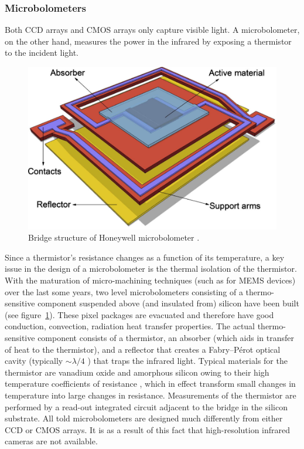\subsubsection{Microbolometers}
Both CCD arrays and CMOS arrays only capture visible light.
%
A microbolometer, on the other hand, measures the power in the infrared by exposing a thermistor to the incident light.
%
\begin{figure}[!htbp][b]
	\center
	\includegraphics[width=.7\linewidth,keepaspectratio]{figures/background/microbolometer2.png}
	\caption{Bridge structure of Honeywell microbolometer \cite{KESIM2014245}.}
	\label{fig:microbolometer}
\end{figure}
%
Since a thermistor's resistance changes as a function of its temperature, a key issue in the design of a microbolometer is the thermal isolation of the thermistor.
%
With the maturation of micro-machining techniques (such as for MEMS devices) over the last some years, two level microbolometers consisting of a thermo-sensitive component suspended above (and insulated from) silicon have been built (see figure~\ref{fig:microbolometer}).
%
These pixel packages are evacuated and therefore have good conduction, convection, radiation heat transfer properties.
%
The actual thermo-sensitive component consists of a thermistor, an absorber (which aids in transfer of heat to the thermistor), and a reflector that creates a Fabry–Pérot optical cavity (typically \({\sim}\lambda/4\) \cite{bolometer}) that traps the infrared light.
%
Typical materials for the thermistor are vanadium oxide and amorphous silicon owing to their high temperature coefficients of resistance \cite{bolometer}, which in effect transform small changes in temperature into large changes in resistance.
%
Measurements of the thermistor are performed by a read-out integrated circuit adjacent to the bridge in the silicon substrate.
%
All told microbolometers are designed much differently from either CCD or CMOS arrays.
%
It is as a result of this fact that high-resolution infrared cameras are not available.

